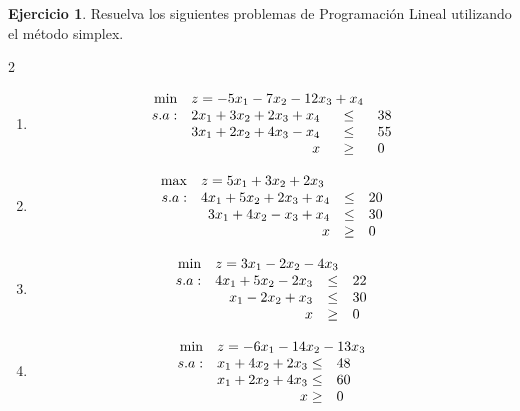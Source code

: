 \documentclass[12pt]{article}
\theoremstyle{definition}
\newtheorem{ejer}{Ejercicio}
\newcommand{\bej}{\begin{ejer}}
\newcommand{\fej}{\end{ejer}}
\begin{document}
\bej
Resuelva los siguientes problemas de Programación Lineal utilizando el método simplex.
\begin{multicols}{2}
\begin{enumerate}[label=\alph*)]
    \item \[
            \begin{array}{rrcl}
            \min & \multicolumn{2}{l}{z = -5x_1-7x_2-12x_3+x_4} \\
            s.a: & 2x_1+3x_2+2x_3+x_4 & \leq & 38 \\
             & 3x_1+2x_2+4x_3-x_4 & \leq & 55 \\
             & x& \geq & 0
            \end{array}
            \]
    \item \[
            \begin{array}{rrcl}
            \max & \multicolumn{2}{l}{z = 5x_1+3x_2+2x_3} \\
            s.a: & 4x_1+5x_2+2x_3+x_4 & \leq & 20 \\
             & 3x_1+4x_2-x_3+x_4 & \leq & 30 \\
             & x& \geq & 0
            \end{array}
            \]
    \item \[
            \begin{array}{rrcl}
            \min & \multicolumn{2}{l}{z = 3x_1-2x_2-4x_3} \\
            s.a: & 4x_1+5x_2-2x_3 & \leq & 22 \\
             & x_1-2x_2+x_3 & \leq & 30 \\
             & x& \geq & 0
            \end{array}
            \]
    \item \[
            \begin{array}{rrl}
            \min & \multicolumn{2}{l}{z = -6x_1-14x_2-13x_3} \\
            s.a: & x_1+4x_2+2x_3  \leq & 48 \\
             & x_1+2x_2+4x_3 \leq & 60 \\
              & x \geq & 0
            \end{array}
            \]
\end{enumerate}
\end{multicols}
\fej
\end{document}
